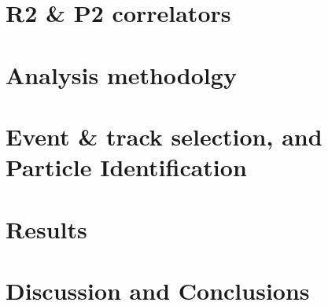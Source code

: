 \documentclass[12pt,a4paper,twoside]{article}
\newcommand{\firstpagemargin}{\setlength{\headsep}{115pt}\setlength{\textheight}{610pt}}
\begin{document}
\section{R2 \& P2 correlators}\firstpagemargin
\newpage
\section{Analysis methodolgy}\firstpagemargin
\newpage
\section{Event \& track selection, and Particle Identification}\firstpagemargin
\newpage
\section{Results}\firstpagemargin
\newpage
\section{Discussion and Conclusions}\firstpagemargin
\end{document}
